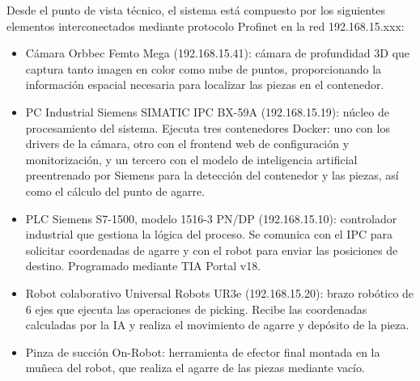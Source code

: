 \clearpage
{}

Desde el punto de vista técnico, el sistema está compuesto por los siguientes elementos interconectados mediante
protocolo Profinet en la red 192.168.15.xxx:
\begin{itemize}
	\item Cámara Orbbec Femto Mega (192.168.15.41): cámara de profundidad 3D que captura tanto imagen en
	      color como nube de puntos, proporcionando la información espacial necesaria para localizar
	      las piezas en el contenedor.
	\item PC Industrial Siemens SIMATIC IPC BX-59A (192.168.15.19): núcleo de procesamiento del sistema.
	      Ejecuta tres contenedores Docker: uno con los drivers de la cámara, otro con el frontend
	      web de configuración y monitorización, y un tercero con el modelo de inteligencia artificial
	      preentrenado por Siemens para la detección del contenedor y las piezas, así como el cálculo
	      del punto de agarre.
	\item PLC Siemens S7-1500, modelo 1516-3 PN/DP (192.168.15.10): controlador industrial que gestiona
	      la lógica del proceso. Se comunica con el IPC para solicitar coordenadas de agarre y con
	      el robot para enviar las posiciones de destino. Programado mediante TIA Portal v18.
	\item Robot colaborativo Universal Robots UR3e (192.168.15.20): brazo robótico de 6 ejes que
	      ejecuta las operaciones de picking. Recibe las coordenadas calculadas por la IA y
	      realiza el movimiento de agarre y depósito de la pieza.
	\item Pinza de succión On-Robot: herramienta de efector final montada en la muñeca del robot,
	      que realiza el agarre de las piezas mediante vacío.
\end{itemize}

